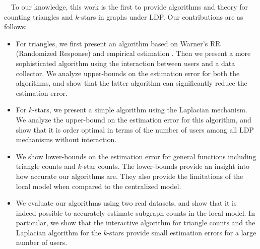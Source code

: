\smallskip
{}~~To our knowledge, this work is the first to 
provide algorithms and theory for 
counting triangles and $k$-stars in graphs under LDP. 
Our contributions are as follows:
\begin{itemize}
    \item For triangles, we first present an algorithm based on 
    Warner's RR (Randomized Response) \cite{Warner_JASA65} 
    and empirical estimation \cite{Kairouz_ICML16,Murakami_USENIX19,Wang_USENIX17}. 
    Then we present a more sophisticated algorithm using the interaction between users and a data collector. 
    We analyze upper-bounds on the estimation error for both the algorithms, and show that the latter algorithm can  significantly reduce the estimation error. 
    \item For $k$-stars, we present a simple algorithm using the Laplacian mechanism. 
    We analyze the upper-bound on the estimation error for this algorithm, and 
    show that 
    it is 
    order optimal 
    in terms of the number of users among all LDP mechanisms without interaction.
    \item We show lower-bounds on the estimation error for general functions including triangle counts and $k$-star counts. 
    The lower-bounds provide an insight into how accurate our algorithms are. 
    They also provide the limitations of the local model when compared to the centralized model.
    \item We evaluate our algorithms using two real datasets, and show that 
    it is indeed possible to accurately estimate 
    subgraph counts in the local model. 
    In particular, we show that 
    the interactive algorithm for triangle counts and the Laplacian algorithm for the $k$-stars provide small estimation errors for a large number of users.
\end{itemize}

